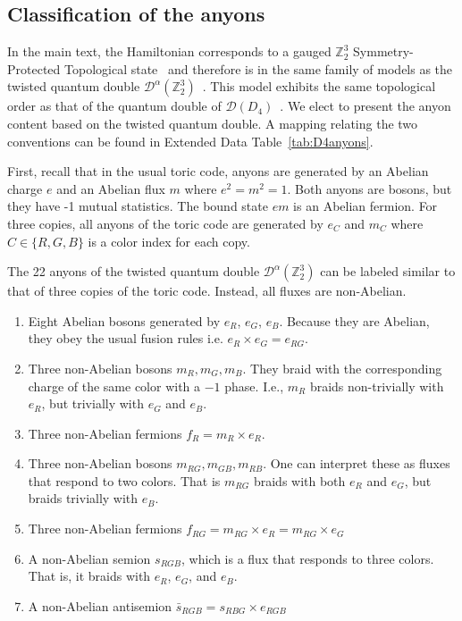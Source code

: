 \documentclass[nofootinbib,pra,twocolumn,showpacs,superscriptaddress,notitlepage,amsmath]{revtex4-2} %
\def\ZZ{\mathbb Z}
\begin{document}
\subsection{Classification of the anyons}\label{appendix_anyons}

In the main text, the Hamiltonian corresponds to a gauged $\mathbb Z_2^3$ Symmetry-Protected Topological state~\cite{yoshida_topological_2016} and therefore is in the same family of models as the twisted quantum double $\mathcal D^\alpha(\mathbb Z_2^3)$~\cite{dijkgraaf_topological_1990,dijkgraaf_quasi_1991,hu_twisted_2013}. This model exhibits the same topological order as that of the quantum double of $\mathcal D(D_4)$~\cite{propitius_topological_1995,lootens_mapping_2022}. We elect to present the anyon content based on the twisted quantum double. A mapping relating the two conventions can be found in Extended Data Table~\ref{tab:D4anyons}.

First, recall that in the usual toric code, anyons are generated by an Abelian charge $e$ and an Abelian flux $m$ where $e^2 = m^2 =1$. Both anyons are bosons, but they have -1 mutual statistics. The bound state $em$ is an Abelian fermion. For three copies, all anyons of the toric code are generated by $e_C$ and $m_C$ where $C \in \{ R,G,B\}$ is a color index for each copy.

The 22 anyons of the twisted quantum double $\mathcal D^\alpha(\ZZ_2^3)$ can be labeled similar to that of three copies of the toric code. Instead, all fluxes are non-Abelian.

\begin{enumerate}
\item Eight Abelian bosons generated by $e_R$, $e_G$, $e_B$. Because they are Abelian, they obey the usual fusion rules i.e. $e_R \times e_G = e_{RG}$.
\item Three non-Abelian bosons $m_{R}, m_{G},m_{B}$. They braid with the corresponding charge of the same color with a $-1$ phase. I.e., $m_R$ braids non-trivially with $e_R$, but trivially with $e_G$ and $e_B$.
\item Three non-Abelian fermions $f_{R} = m_{R} \times e_R$. 
\item Three non-Abelian bosons $m_{RG},m_{GB}, m_{RB}$. One can interpret these as fluxes that respond to two colors.  That is $m_{RG}$ braids with both $e_R$ and $e_G$, but braids trivially with $e_B$.
\item Three non-Abelian fermions $f_{RG} = m_{RG} \times e_R = m_{RG} \times e_G$
\item A non-Abelian semion $s_{RGB}$, which is a flux that responds to three colors. That is, it braids with $e_R$, $e_G$, and $e_B$.
\item A non-Abelian antisemion $\bar s_{RGB} = s_{RBG} \times e_{RGB}$
\end{enumerate}
\end{document}
